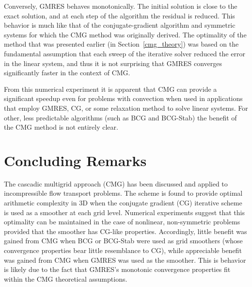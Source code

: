 Conversely, GMRES behaves monotonically.  The initial solution is close to the exact solution, and at each step of the algorithm the residual is reduced.  This behavior is much like that of the conjugate-gradient algorithm and symmetric systems for which the CMG method was originally derived.  The optimality of the method that was presented earlier (in Section~\ref{cmg_theory}) was based on the fundamental assumption that each sweep of the iterative solver reduced the error in the linear system, and thus it is not surprising that GMRES converges significantly faster in the context of CMG.

From this numerical experiment it is apparent that CMG can provide a significant speedup even for problems with convection when used in applications that employ GMRES, CG, or some relaxation method to solve linear systems.  For other, less predictable algorithms (such as BCG and BCG-Stab) the benefit of the CMG method is not entirely clear.


\section{Concluding Remarks}
The cascadic multigrid approach (CMG) has been discussed and applied to incompressible flow transport problems.  The scheme is found to provide optimal arithmetic complexity in 3D when the conjugate gradient (CG) iterative scheme is used as a smoother at each grid level.  Numerical experiments suggest that this optimality can be maintained in the case of nonlinear, non-symmetric problems provided that the smoother has CG-like properties.  Accordingly, little benefit was gained from CMG when BCG or BCG-Stab were used as grid smoothers (whose convergence properties bear little resemblance to CG), while appreciable benefit was gained from CMG when GMRES was used as the smoother.  This is behavior is likely due to the fact that GMRES's monotonic convergence properties fit within the CMG theoretical assumptions. 


